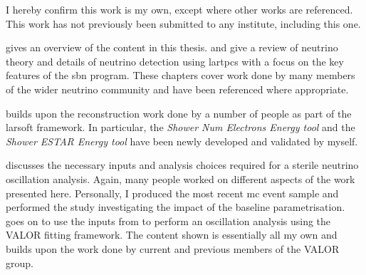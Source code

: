 \begin{declaration}
  
  I hereby confirm this work is my own, except where other works are referenced. This work has not previously been submitted to any institute, including this one.
  
   gives an overview of the content in this thesis.  and  give a review of neutrino theory and details of neutrino detection using \glspl{lartpc} with a focus on the key features of the \gls{sbn} program. These chapters cover work done by many members of the wider neutrino community and have been referenced where appropriate. 
  
   builds upon the reconstruction work done by a number of people as part of the \gls{larsoft} framework. In particular, the \textit{Shower Num Electrons Energy tool} and the \textit{Shower ESTAR Energy tool} have been newly developed and validated by myself.
  
   discusses the necessary inputs and analysis choices required for a sterile neutrino oscillation analysis. Again, many people worked on different aspects of the work presented here. Personally, I produced the most recent \nue \gls{mc} event sample and performed the study investigating the impact of the baseline parametrisation.  goes on to use the inputs from  to perform an oscillation analysis using the VALOR fitting framework. The content shown is essentially all my own and builds upon the work done by current and previous members of the VALOR group. 
  
  \begin{comment}
  Chapters 2 - Historical neutrino overview, obviously not my own work. \\
  Chapter 3 - LArTPC physics and SBN program overview. Small contribution to work on the PDS system, otherwise not my work. \\
  Chapter 4 - Many people work on Larsoft / Reconstruction. Shower Linear Energy tool originally worked on by Dom. Other two tools developed by me. \\
  Chapter 5 - \nue event production and selection is work done by Dom (and Gray?), however, the most recent events sample were produced by me using their work. GENIE/miniboone systematics is work done by SOMEONE?. Detector systematics developed by VALOR group. Baseline approximation done by steve/dom. Impact of baseline studies done by me. \\
  Chapter 6 - VALOR intially develped by Costas et. al. \nue stuff all done by me. Rhiannon did \numu. Impact of detector systematics all done by moi. 
  
  \end{comment}
\end{declaration}